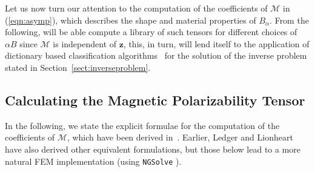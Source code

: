 \noindent
Let us now turn our attention to the computation of the coefficients of $\mathcal{M}$ in (\ref{eqn:asymp}), which describes the shape and material properties of $B_\alpha$. From the following, will be able compute a library of such tensors for different choices of $\alpha B$ since ${\mathcal M}$ is independent of ${\bm z}$, this, in turn, will lend itself to the application of dictionary based classification algorithms~\cite{LedgerLionheartamad2019} for the solution of the inverse problem stated in Section~\ref{sect:inverseproblem}.


\subsection{Calculating the Magnetic Polarizability Tensor}\label{sectCalculatingMPT}
In the following, we state the explicit formulae for the computation of the coefficients of $\mathcal{M}$, which have been derived in~\cite{LedgerLionheart2019}.  Earlier, Ledger and Lionheart~\cite{LedgerLionheart2015,LedgerLionheart2016,LedgerLionheart2018} have also derived other equivalent formulations, but those below lead to a more natural FEM implementation (using {\texttt{NGSolve}} ).

